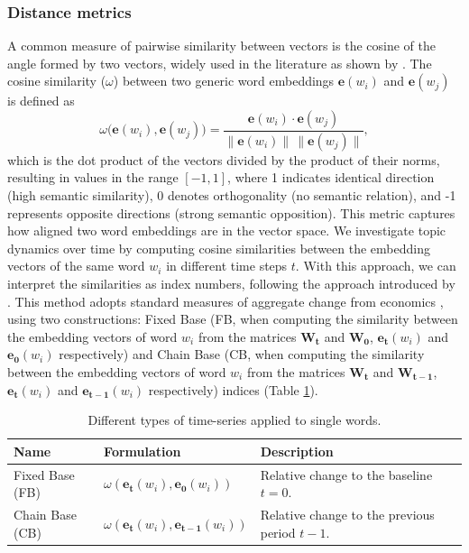 \subsubsection{Distance metrics}\label{subsec33}
 A common measure of pairwise similarity between vectors is the cosine of the angle formed by two vectors, widely used in the literature as shown by \cite{Levy2014}. The cosine similarity ($\omega$) between two generic word embeddings $\mathbf{e}(w_i)$ and $\mathbf{e}(w_j)$ is defined as
\begin{equation}
    \omega\big(\mathbf{e}(w_i), \mathbf{e}(w_j)\big) = \frac{\mathbf{e}(w_i) \cdot \mathbf{e}(w_j)}{\|\mathbf{e}(w_i)\| \, \|\mathbf{e}(w_j)\|},
\end{equation}
which is the dot product of the vectors divided by the product of their norms, resulting in values in the range $[-1,1]$, where 1 indicates identical direction (high semantic similarity), 0 denotes orthogonality (no semantic relation), and -1 represents opposite directions (strong semantic opposition). This metric captures how aligned two word embeddings are in the vector space. We investigate topic dynamics over time by computing cosine similarities between the embedding vectors of the same word $w_i$ in different time steps $t$. With this approach, we can interpret the similarities as index numbers, following the approach introduced by \cite{Serraino2025}. This method adopts standard measures of aggregate change from economics \cite{Balk2008}, using two constructions: Fixed Base (FB, when computing the similarity between the embedding vectors of word $w_i$ from the matrices $\mathbf{W_t}$ and $\mathbf{W_0}$, $\mathbf{e_t}(w_i)$ and $\mathbf{e_0}(w_i)$ respectively) and Chain Base (CB, when computing the similarity between the embedding vectors of word $w_i$ from the matrices $\mathbf{W_t}$ and $\mathbf{W_{t-1}}$,  $\mathbf{e_t}(w_i)$ and $\mathbf{e_{t-1}}(w_i)$ respectively) indices (Table \ref{tab:numind}).

\begin{table}[h!]
\centering
\caption{Different types of time-series applied to single words.}

\begin{tabularx}{\linewidth}{l l X}
\toprule
\textbf{Name} & \textbf{Formulation} & \textbf{Description} \\ 
\midrule
Fixed Base (FB) & $\omega(\mathbf{e_t}(w_i), \mathbf{e_0}(w_i))$ & Relative change to the baseline $t=0$. \\
Chain Base (CB) & $\omega(\mathbf{e_t}(w_i), \mathbf{e_{t-1}}(w_i))$ & Relative change to the previous period $t-1$. \\
\bottomrule
\end{tabularx}\label{tab:numind}
\end{table}



